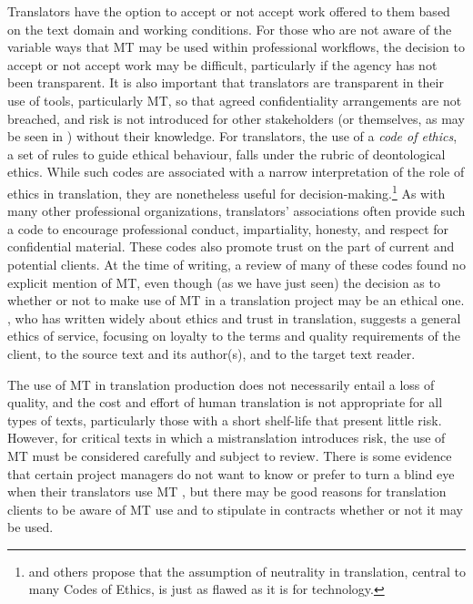 \documentclass[output=paper]{langscibook}
\begin{document}
Translators have the option to accept or not accept work offered to them based on the text domain and working conditions. For those who are not aware of the variable ways that MT may be used within professional workflows, the decision to accept or not accept work may be difficult, particularly if the agency has not been transparent. It is also important that translators are transparent in their use of tools, particularly MT, so that agreed confidentiality arrangements are not breached, and risk is not introduced for other stakeholders (or themselves, as may be seen in ) without their knowledge. For translators, the use of a \textit{code of ethics}, a set of rules to guide ethical behaviour, falls under the rubric of deontological ethics. While such codes are associated with a narrow interpretation of the role of ethics in translation, they are nonetheless useful for decision-making.\footnote{\citet{Lambert2018} and others propose that the assumption of neutrality in translation, central to many Codes of Ethics, is just as flawed as it is for technology.} As with many other professional organizations, translators’ associations often provide such a code to encourage professional conduct, impartiality, honesty, and respect for confidential material. These codes also promote trust on the part of current and potential clients. At the time of writing, a review of many of these codes found no explicit mention of MT, even though (as we have just seen) the decision as to whether or not to make use of MT in a translation project may be an ethical one. \citet{Chesterman2001}, who has written widely about ethics and trust in translation, suggests a general ethics of service, focusing on loyalty to the terms and quality requirements of the client, to the source text and its author(s), and to the target text reader.

The use of MT in translation production does not necessarily entail a loss of quality, and the cost and effort of human translation is not appropriate for all types of texts, particularly those with a short shelf-life that present little risk. However, for critical texts in which a mistranslation introduces risk, the use of MT must be considered carefully and subject to review. There is some evidence that certain project managers do not want to know or prefer to turn a blind eye when their translators use MT \citep{Sakamoto2019}, but there may be good reasons for translation clients to be aware of MT use and to stipulate in contracts whether or not it may be used.
\end{document}
